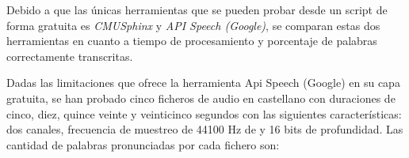 \documentclass[../main.tex]{subfiles}
\begin{document}
\begin{table}[h]
    \centering
    \caption{Comparativa de herramientas de reconocimiento de voz}
    \label{tab:comp_herramientas}
\end{table}

Debido a que las únicas herramientas que se pueden probar desde un script de forma gratuita es \textit{CMUSphinx} y \textit{API Speech (Google)}, se comparan estas dos herramientas en cuanto a tiempo de procesamiento y porcentaje de palabras correctamente transcritas.

Dadas las limitaciones que ofrece la herramienta Api Speech (Google) en su capa gratuita, se han probado cinco ficheros de audio en castellano con duraciones de cinco, diez, quince veinte y veinticinco segundos con las siguientes características: dos canales, frecuencia de muestreo de 44100 Hz de y 16 bits de profundidad. Las cantidad de palabras pronunciadas por cada fichero son: 

\begin{table}[H]
    \centering
    \caption{Información de audios de prueba}
    \label{tab:audios-palabras}
\end{table}
\end{document}
